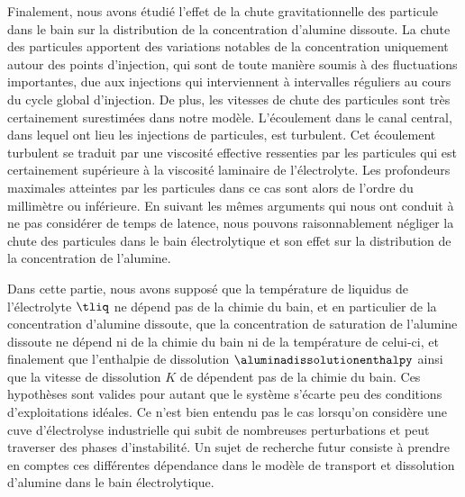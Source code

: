 Finalement, nous avons étudié l'effet de la chute gravitationnelle des
particule dans le bain sur la distribution de la concentration
d'alumine dissoute. La chute des particules apportent des variations
notables de la concentration uniquement autour des points d'injection,
qui sont de toute manière soumis à des fluctuations importantes, due
aux injections qui interviennent à intervalles réguliers au cours du
cycle global d'injection. De plus, les vitesses de chute des
particules sont très certainement surestimées dans notre
modèle. L'écoulement dans le canal central, dans lequel ont lieu les
injections de particules, est turbulent. Cet écoulement turbulent se
traduit par une viscosité effective ressenties par les particules qui
est certainement supérieure à la viscosité laminaire de
l'électrolyte. Les profondeurs maximales atteintes par les particules
dans ce cas sont alors de l'ordre du millimètre ou inférieure. En
suivant les mêmes arguments qui nous ont conduit à ne pas considérer
de temps de latence, nous pouvons raisonnablement négliger la chute
des particules dans le bain électrolytique et son effet sur la
distribution de la concentration de l'alumine.

Dans cette partie, nous avons supposé que la température de liquidus de
l'électrolyte $\tliq$ ne dépend pas de la chimie du bain, et en
particulier de la concentration d'alumine dissoute, que la
concentration de saturation de l'alumine dissoute ne dépend ni de la
chimie du bain ni de la température de celui-ci, et finalement que
l'enthalpie de dissolution $\aluminadissolutionenthalpy$ ainsi que la vitesse
de dissolution $K$ de dépendent pas de la chimie du bain. Ces hypothèses
sont valides pour autant que le système s'écarte peu des conditions
d'exploitations idéales. Ce n'est bien entendu pas le cas lorsqu'on
considère une cuve d'électrolyse industrielle qui subit de nombreuses
perturbations et peut traverser des phases d'instabilité. Un sujet de
recherche futur consiste à prendre en comptes ces différentes
dépendance dans le modèle de transport et dissolution d'alumine dans
le bain électrolytique.


%
